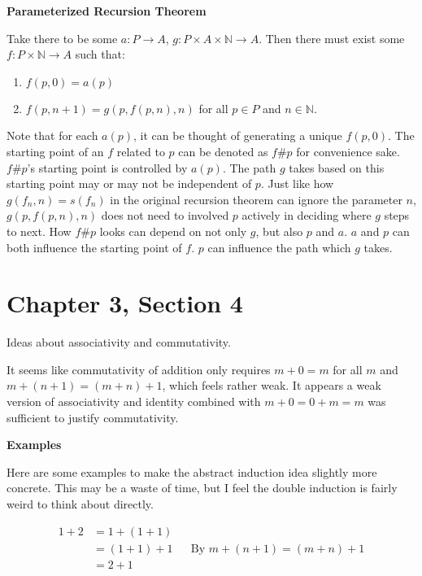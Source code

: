 \documentclass{article}
\begin{document}
\begin{enumerate}
\medskip
\textbf{Parameterized Recursion Theorem}
\medskip

Take there to be some $a: P \xrightarrow{} A$, $g: P \times A \times \mathbb{N} \xrightarrow{} A$. Then there must exist some $f: P \times \mathbb{N} \xrightarrow{} A$ such that:

\begin{enumerate}
	\item $f(p, 0) = a(p)$
	\item $f(p, n + 1) = g(p, f(p, n), n)$ for all $p \in P$ and $n \in \mathbb{N}$.
\end{enumerate}

Note that for each $a(p)$, it can be thought of generating a unique $f(p, 0)$. The starting point of an $f$ related to $p$ can be denoted as $f\#p$ for convenience sake. $f\#p$'s starting point is controlled by $a(p)$. The path $g$ takes based on this starting point may or may not be independent of $p$. Just like how $g(f_n,n) = s(f_n)$ in the original recursion theorem can ignore the parameter $n$, $g(p, f(p, n), n)$ does not need to involved $p$ actively in deciding where $g$ steps to next. How $f\#p$ looks can depend on not only $g$, but also $p$ and $a$. $a$ and $p$ can both influence the starting point of $f$. $p$ can influence the path which $g$ takes. 

\section{Chapter 3, Section 4}

Ideas about associativity and commutativity. 

It seems like commutativity of addition only requires $m + 0 = m$ for all $m$ and $m + (n + 1) = (m + n) + 1$, which feels rather weak. It appears a weak version of associativity and identity combined with $m + 0 = 0 + m = m$ was sufficient to justify commutativity. 

\medskip
\textbf{Examples}
\medskip

Here are some examples to make the abstract induction idea slightly more concrete. This may be a waste of time, but I feel the double induction is fairly weird to think about directly.

\begin{align*}
	1 + 2 &= 1 + (1 + 1)\\
	&= (1 + 1) + 1 && \text{By $m + (n + 1) = (m + n) + 1$}\\
	&= 2 + 1\\
\end{align*}


\end{enumerate}
\end{document}
